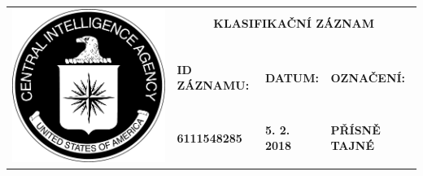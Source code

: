 \documentclass[a4paper, 11pt]{article}
\newcommand{\blackcell}{\cellcolor{black} \color{white} \ttfamily \bfseries}
\begin{document}
	\noindent
	\begin{table}[H]
		\renewcommand\tabularxcolumn[1]{m{#1}}
		\def\arraystretch{1.5}
		\begin{tabularx}{\textwidth}{l X X X}
			\multirow{4}{*}{ \includegraphics[scale=0.22]{sources/CIA_logo.pdf} } & \multicolumn{3}{c}{\bfseries \ttfamily \Huge KLASIFIKAČNÍ ZÁZNAM} \\
			&&&\\
			& \blackcell ID ZÁZNAMU: & \blackcell DATUM: & \blackcell OZNAČENÍ: \\
			& \blackcell 6111548285 & \blackcell 5. 2. 2018 & \blackcell PŘÍSNĚ TAJNÉ \\
			
		\end{tabularx}
	\end{table}
	
\end{document}
